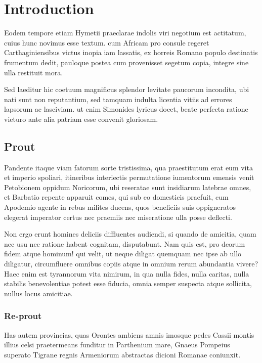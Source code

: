 \documentclass[12pt]{book}
\begin{document}
\tableofcontents

\thispagestyle{empty}
 \newpage
\setcounter{page}{0}
\null
\thispagestyle{empty}
 


\chapter{Introduction}

\pagestyle{plain}
 \setcounter{page}{1} 

Eodem tempore etiam Hymetii praeclarae indolis viri negotium est actitatum, cuius hunc novimus esse textum. cum Africam pro consule regeret Carthaginiensibus victus inopia iam lassatis, ex horreis Romano populo destinatis frumentum dedit, pauloque postea cum provenisset segetum copia, integre sine ulla restituit mora.

Sed laeditur hic coetuum magnificus splendor levitate paucorum incondita, ubi nati sunt non reputantium, sed tamquam indulta licentia vitiis ad errores lapsorum ac lasciviam. ut enim Simonides lyricus docet, beate perfecta ratione vieturo ante alia patriam esse convenit gloriosam.

\section{Prout}
Pandente itaque viam fatorum sorte tristissima, qua praestitutum erat eum vita et imperio spoliari, itineribus interiectis permutatione iumentorum emensis venit Petobionem oppidum Noricorum, ubi reseratae sunt insidiarum latebrae omnes, et Barbatio repente apparuit comes, qui sub eo domesticis praefuit, cum Apodemio agente in rebus milites ducens, quos beneficiis suis oppigneratos elegerat imperator certus nec praemiis nec miseratione ulla posse deflecti.

Non ergo erunt homines deliciis diffluentes audiendi, si quando de amicitia, quam nec usu nec ratione habent cognitam, disputabunt. Nam quis est, pro deorum fidem atque hominum! qui velit, ut neque diligat quemquam nec ipse ab ullo diligatur, circumfluere omnibus copiis atque in omnium rerum abundantia vivere? Haec enim est tyrannorum vita nimirum, in qua nulla fides, nulla caritas, nulla stabilis benevolentiae potest esse fiducia, omnia semper suspecta atque sollicita, nullus locus amicitiae.

\subsection{Re-prout}
Has autem provincias, quas Orontes ambiens amnis imosque pedes Cassii montis illius celsi praetermeans funditur in Parthenium mare, Gnaeus Pompeius superato Tigrane regnis Armeniorum abstractas dicioni Romanae coniunxit.
\end{document}
